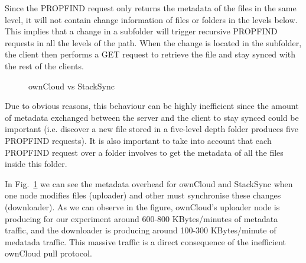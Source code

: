 Since the PROPFIND request only returns the metadata of the files in the same level, it will not contain change information of files or folders in the levels below. This implies that a change in a subfolder will trigger recursive PROPFIND requests in all the levels of the path. When the change is located in the subfolder, the client then performs a GET request to retrieve the file and stay synced with the rest of the clients.



\begin{figure}[t]
  \centering
  \caption{ownCloud vs StackSync}
  \vspace{-5pt}
  \label{fig:owncloud}
\end{figure}


Due to obvious reasons, this behaviour can be highly inefficient since the amount of metadata exchanged between the server and the client to stay synced could be important (i.e. discover a new file stored in a five-level depth folder produces five PROPFIND requests). It is also important to take into account that each PROPFIND request over a folder involves to get the metadata of all the files inside this folder.

In Fig.~\ref{fig:owncloud} we can see the metadata overhead for ownCloud and StackSync when one node modifies files (uploader) and other must synchronise these changes (downloader). As we can observe in the figure, ownCloud's uploader node is producing for our experiment around 600-800 KBytes/minutes of metadata traffic, and the downloader is producing around 100-300 KBytes/minute of medatada traffic.  This massive traffic is a direct consequence of the inefficient ownCloud pull protocol.

